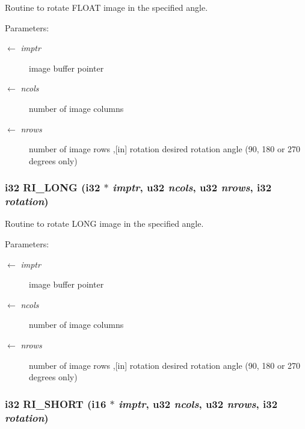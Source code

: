 Routine to rotate FLOAT image in the specified angle. \begin{Desc}
\item[Parameters:]
\begin{description}
\item[\mbox{$\leftarrow$} {\em imptr}]image buffer pointer \item[\mbox{$\leftarrow$} {\em ncols}]number of image columns \item[\mbox{$\leftarrow$} {\em nrows}]number of image rows ,[in] rotation desired rotation angle (90, 180 or 270 degrees only) \end{description}
\end{Desc}
\subsubsection{\setlength{\rightskip}{0pt plus 5cm}i32 RI\_\-LONG (i32 $\ast$ {\em imptr}, u32 {\em ncols}, u32 {\em nrows}, i32 {\em rotation})}\label{GU__transformations_8c_523be0534bbdecee55a3c541e039ef72}


Routine to rotate LONG image in the specified angle. \begin{Desc}
\item[Parameters:]
\begin{description}
\item[\mbox{$\leftarrow$} {\em imptr}]image buffer pointer \item[\mbox{$\leftarrow$} {\em ncols}]number of image columns \item[\mbox{$\leftarrow$} {\em nrows}]number of image rows ,[in] rotation desired rotation angle (90, 180 or 270 degrees only) \end{description}
\end{Desc}
\subsubsection{\setlength{\rightskip}{0pt plus 5cm}i32 RI\_\-SHORT (i16 $\ast$ {\em imptr}, u32 {\em ncols}, u32 {\em nrows}, i32 {\em rotation})}\label{GU__transformations_8c_3b854749d807498df8019084d13d65c5}


